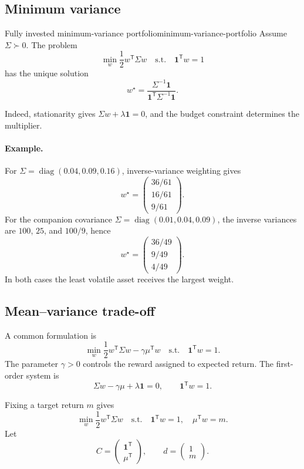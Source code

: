 \documentclass[11pt]{article}
\newcommand{\trans}{^{\mathsf T}}
\newcommand{\diag}{\operatorname{diag}}
\theoremstyle{definition}
\theoremstyle{remark}
\begin{document}
\subsection{Minimum variance}

\begin{keyproposition}{Fully invested minimum-variance portfolio}{minimum-variance-portfolio}
Assume $\Sigma\succ0$. The problem
\[
  \min_w\frac12w\trans\Sigma w
  \quad\text{s.t.}\quad \mathbf1\trans w=1
\]
has the unique solution
\[
  \boxed{
  w^\star=
  \frac{\Sigma^{-1}\mathbf1}
  {\mathbf1\trans\Sigma^{-1}\mathbf1}.}
\]
\end{keyproposition}

Indeed, stationarity gives $\Sigma w+\lambda\mathbf1=0$, and the budget
constraint determines the multiplier.

\paragraph{Example.}
For $\Sigma=\diag(0.04,0.09,0.16)$, inverse-variance weighting gives
\[
w^\star=\begin{pmatrix}36/61\\16/61\\9/61\end{pmatrix}.
\]
For the companion covariance $\Sigma=\diag(0.01,0.04,0.09)$, the inverse
variances are $100$, $25$, and $100/9$, hence
\[
\boxed{w^\star=\begin{pmatrix}36/49\\9/49\\4/49\end{pmatrix}.}
\]
In both cases the least volatile asset receives the largest weight.

\subsection{Mean--variance trade-off}

A common formulation is
\[
  \boxed{
  \min_w\frac12w\trans\Sigma w-\gamma\mu\trans w
  \quad\text{s.t.}\quad\mathbf1\trans w=1.}
\]
The parameter $\gamma>0$ controls the reward assigned to expected return.
The first-order system is
\[
  \Sigma w-\gamma\mu+\lambda\mathbf1=0,
  \qquad \mathbf1\trans w=1.
\]

Fixing a target return $m$ gives
\[
  \min_w\frac12w\trans\Sigma w
  \quad\text{s.t.}\quad
  \mathbf1\trans w=1,
  \quad \mu\trans w=m.
\]
Let
\[
  C=\begin{pmatrix}\mathbf1\trans\\\mu\trans\end{pmatrix},
  \qquad d=\begin{pmatrix}1\\m\end{pmatrix}.
\]
\end{document}
